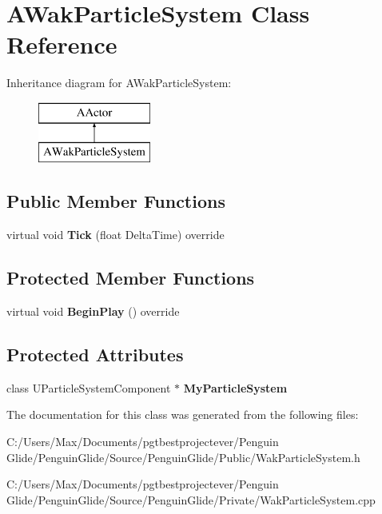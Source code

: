 \hypertarget{class_a_wak_particle_system}{}\section{A\+Wak\+Particle\+System Class Reference}
\label{class_a_wak_particle_system}
Inheritance diagram for A\+Wak\+Particle\+System\+:\begin{figure}[H]
\begin{center}
\leavevmode
\includegraphics[height=2.000000cm]{class_a_wak_particle_system}
\end{center}
\end{figure}
\subsection*{Public Member Functions}
\begin{DoxyCompactItemize}
\item 
\mbox{\label{class_a_wak_particle_system_ae58528f3a3bf789eef52a4f9e7a60e14}} 
virtual void {\bfseries Tick} (float Delta\+Time) override
\end{DoxyCompactItemize}
\subsection*{Protected Member Functions}
\begin{DoxyCompactItemize}
\item 
\mbox{\label{class_a_wak_particle_system_a72beab934ecd5b2344a96f980c3264c1}} 
virtual void {\bfseries Begin\+Play} () override
\end{DoxyCompactItemize}
\subsection*{Protected Attributes}
\begin{DoxyCompactItemize}
\item 
\mbox{\label{class_a_wak_particle_system_a774afe5f9b4f0eaefb55709ddc8e424e}} 
class U\+Particle\+System\+Component $\ast$ {\bfseries My\+Particle\+System}
\end{DoxyCompactItemize}


The documentation for this class was generated from the following files\+:\begin{DoxyCompactItemize}
\item 
C\+:/\+Users/\+Max/\+Documents/pgtbestprojectever/\+Penguin Glide/\+Penguin\+Glide/\+Source/\+Penguin\+Glide/\+Public/Wak\+Particle\+System.\+h\item 
C\+:/\+Users/\+Max/\+Documents/pgtbestprojectever/\+Penguin Glide/\+Penguin\+Glide/\+Source/\+Penguin\+Glide/\+Private/Wak\+Particle\+System.\+cpp\end{DoxyCompactItemize}
